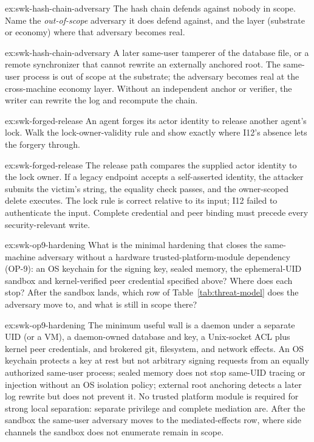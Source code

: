 \documentclass[11pt,a4paper]{article}
\theoremstyle{definition}
\theoremstyle{remark}
\begin{document}
\begin{pdexercise}[kind=Check,rating=1]{ex:swk-hash-chain-adversary}
The hash chain defends against nobody in scope. Name the \emph{out-of-scope} adversary it does defend against, and the layer (substrate or economy) where that adversary becomes real.
\end{pdexercise}
\begin{pdsolution}{ex:swk-hash-chain-adversary}
A later same-user tamperer of the database file, or a remote synchronizer that cannot rewrite an externally anchored root. The same-user process is out of scope at the substrate; the adversary becomes real at the cross-machine economy layer. Without an independent anchor or verifier, the writer can rewrite the log and recompute the chain.
\end{pdsolution}
\begin{pdexercise}[kind=Trace,rating=2]{ex:swk-forged-release}
An agent forges its actor identity to release another agent's lock. Walk the lock-owner-validity rule and show exactly where I12's absence lets the forgery through.
\end{pdexercise}
\begin{pdsolution}{ex:swk-forged-release}
The release path compares the supplied actor identity to the lock owner. If a legacy endpoint accepts a self-asserted identity, the attacker submits the victim's string, the equality check passes, and the owner-scoped delete executes. The lock rule is correct relative to its input; I12 failed to authenticate the input. Complete credential and peer binding must precede every security-relevant write.
\end{pdsolution}
\begin{pdexercise}[kind=Open,rating=3]{ex:swk-op9-hardening}
What is the minimal hardening that closes the same-machine adversary without a hardware trusted-platform-module dependency (OP-9): an OS keychain for the signing key, sealed memory, the ephemeral-UID sandbox and kernel-verified peer credential specified above? Where does each stop? After the sandbox lands, which row of Table~\ref{tab:threat-model} does the adversary move to, and what is still in scope there?
\end{pdexercise}
\begin{pdsolution}{ex:swk-op9-hardening}
The minimum useful wall is a daemon under a separate UID (or a VM), a daemon-owned database and key, a Unix-socket ACL plus kernel peer credentials, and brokered git, filesystem, and network effects. An OS keychain protects a key at rest but not arbitrary signing requests from an equally authorized same-user process; sealed memory does not stop same-UID tracing or injection without an OS isolation policy; external root anchoring detects a later log rewrite but does not prevent it. No trusted platform module is required for strong local separation: separate privilege and complete mediation are. After the sandbox the same-user adversary moves to the mediated-effects row, where side channels the sandbox does not enumerate remain in scope.
\end{pdsolution}
\end{document}

